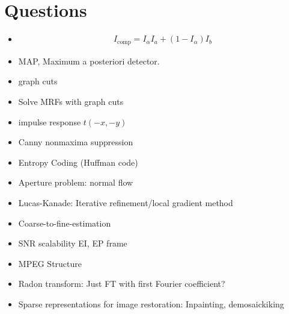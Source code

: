 \newpage
\chapter{Questions}
\begin{itemize}[leftmargin=2em]
	\item 
	\begin{gather*}
		I_{\text{comp}}=I_{\alpha}I_{a}+\left( 1-I_{\alpha} \right)I_b
	\end{gather*}
	\item MAP, Maximum a posteriori detector.
	\item graph cuts
	\item Solve MRFs with graph cuts
	\item impulse response $t(-x,-y)$
	\item Canny nonmaxima suppression
	\item Entropy Coding (Huffman code)
	\item Aperture problem: normal flow
	\item Lucas-Kanade: Iterative refinement/local gradient method
	\item Coarse-to-fine-estimation
	\item SNR scalability EI, EP frame
	\item MPEG Structure
	\item Radon transform: Just FT with first Fourier coefficient?
	\item Sparse representations for image restoration: Inpainting, demosaickiking
\end{itemize}
\vfill
